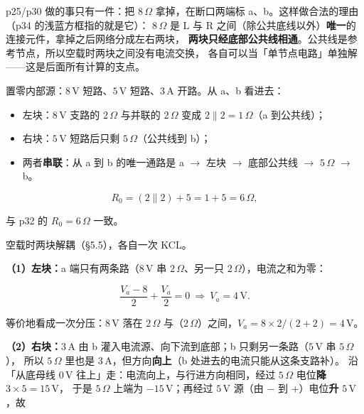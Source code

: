 \documentclass[11pt]{ctexart}
\begin{document}
p25/p30 做的事只有一件：把 $8\,\Omega$ 拿掉，在断口两端标 a、b。这样做合法的理由（p34 的浅蓝方框指的就是它）：
$8\,\Omega$ 是 L 与 R 之间（除公共底线以外）\textbf{唯一}的连接元件，拿掉之后网络分成左右两块，
\textbf{两块只经底部公共线相通}。公共线是参考节点，所以空载时两块之间没有电流交换，
各自可以当「单节点电路」单独解——这是后面所有计算的支点。


置零内部源：$8\,\mathrm{V}$ 短路、$5\,\mathrm{V}$ 短路、$3\,\mathrm{A}$ 开路。从 a、b 看进去：

\begin{itemize}
\item 左块：$8\,\mathrm{V}$ 支路的 $2\,\Omega$ 与并联的 $2\,\Omega$ 变成 $2\parallel2=1\,\Omega$（a 到公共线）；
\item 右块：$5\,\mathrm{V}$ 短路后只剩 $5\,\Omega$（公共线到 b）；
\item 两者\textbf{串联}：从 a 到 b 的唯一通路是 a $\to$ 左块 $\to$ 底部公共线 $\to$ $5\,\Omega$ $\to$ b。
\end{itemize}

\[ R_0=(2\parallel2)+5=1+5=6\,\Omega , \]

与 p32 的 $R_0=6\,\Omega$ 一致。



空载时两块解耦（§5.5），各自一次 KCL。

\textbf{（1）左块：}a 端只有两条路（$8\,\mathrm{V}$ 串 $2\,\Omega$、另一只 $2\,\Omega$），电流之和为零：

\[ \frac{V_a-8}{2}+\frac{V_a}{2}=0\ \Longrightarrow\ V_a=4\,\mathrm{V} . \]

等价地看成一次分压：$8\,\mathrm{V}$ 落在 $2\,\Omega$ 与（$2\,\Omega$）之间，$V_a=8\times2/(2+2)=4\,\mathrm{V}$。

\textbf{（2）右块：}$3\,\mathrm{A}$ 由 b 灌入电流源、向下流到底部；b 只剩另一条路（$5\,\mathrm{V}$ 串 $5\,\Omega$），
所以 $5\,\Omega$ 里也是 $3\,\mathrm{A}$，但方向\textbf{向上}（b 处进去的电流只能从这条支路补）。
沿「从底母线 $0\,\mathrm{V}$ 往上」走：电流向上，与行进方向相同，经过 $5\,\Omega$ 电位\textbf{降} $3\times5=15\,\mathrm{V}$，
于是 $5\,\Omega$ 上端为 $-15\,\mathrm{V}$；再经过 $5\,\mathrm{V}$ 源（由 $-$ 到 $+$）电位\textbf{升} $5\,\mathrm{V}$，故
\end{document}
